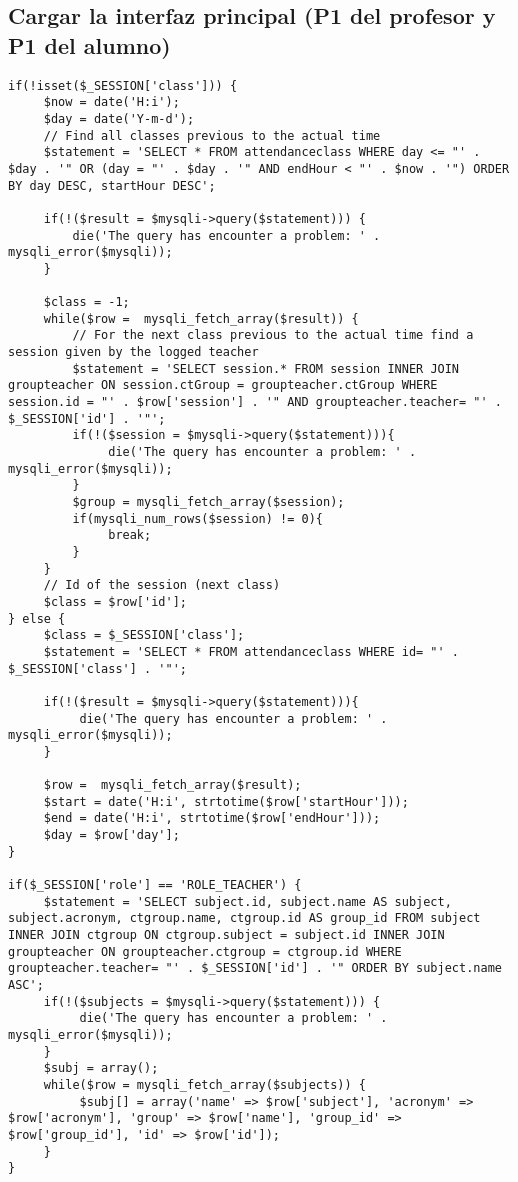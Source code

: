\subsection{Cargar la interfaz principal (P1 del profesor y P1 del alumno)}
\label{diseno-e-implementacion:logica-negocio:carga}

\noindent
\begin{lstlisting}[caption=Obtener información inicial para la carga de la interfaz.,label={lst:get-data}]
if(!isset($_SESSION['class'])) {
     $now = date('H:i');
     $day = date('Y-m-d');
     // Find all classes previous to the actual time
     $statement = 'SELECT * FROM attendanceclass WHERE day <= "' . $day . '" OR (day = "' . $day . '" AND endHour < "' . $now . '") ORDER BY day DESC, startHour DESC';
		
     if(!($result = $mysqli->query($statement))) {
         die('The query has encounter a problem: ' . mysqli_error($mysqli));
     }
		
     $class = -1;
     while($row =  mysqli_fetch_array($result)) {
         // For the next class previous to the actual time find a session given by the logged teacher
         $statement = 'SELECT session.* FROM session INNER JOIN groupteacher ON session.ctGroup = groupteacher.ctGroup WHERE session.id = "' . $row['session'] . '" AND groupteacher.teacher= "' . $_SESSION['id'] . '"';
         if(!($session = $mysqli->query($statement))){
		      die('The query has encounter a problem: ' . mysqli_error($mysqli));
         }
         $group = mysqli_fetch_array($session);
         if(mysqli_num_rows($session) != 0){
              break;
         }
     }
     // Id of the session (next class)
     $class = $row['id'];
} else {
     $class = $_SESSION['class'];
     $statement = 'SELECT * FROM attendanceclass WHERE id= "' . $_SESSION['class'] . '"';
	  
     if(!($result = $mysqli->query($statement))){
          die('The query has encounter a problem: ' . mysqli_error($mysqli));
     }

     $row =  mysqli_fetch_array($result);
     $start = date('H:i', strtotime($row['startHour']));
     $end = date('H:i', strtotime($row['endHour']));
     $day = $row['day'];
}

if($_SESSION['role'] == 'ROLE_TEACHER') {
     $statement = 'SELECT subject.id, subject.name AS subject, subject.acronym, ctgroup.name, ctgroup.id AS group_id FROM subject INNER JOIN ctgroup ON ctgroup.subject = subject.id INNER JOIN groupteacher ON groupteacher.ctgroup = ctgroup.id WHERE groupteacher.teacher= "' . $_SESSION['id'] . '" ORDER BY subject.name ASC';
     if(!($subjects = $mysqli->query($statement))) {
	      die('The query has encounter a problem: ' . mysqli_error($mysqli));
     }
     $subj = array();
     while($row = mysqli_fetch_array($subjects)) {
          $subj[] = array('name' => $row['subject'], 'acronym' => $row['acronym'], 'group' => $row['name'], 'group_id' => $row['group_id'], 'id' => $row['id']);
     }
}
\end{lstlisting}

